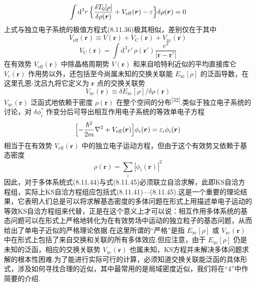 \begin{equation}
  \int\mathrm{d}^{3}r\,\Bigl\{\frac{\delta T_{0}[\rho]}{\delta\rho(\boldsymbol{r})}+V_{\mathrm{eff}}(\boldsymbol{r})-\varepsilon\Bigr\}\delta\rho(\boldsymbol{r})=0
\end{equation}
上式与独立电子系统的极值方程式(8.11.36)极其相似，差别仅在于其中
\begin{equation}
  V_{\mathrm{eff}}(\boldsymbol{r})\equiv V(\boldsymbol{r})+V_{\mathrm{C}}(\boldsymbol{r})+V_{\mathrm{xc}}(\boldsymbol{r})
\end{equation}
\begin{equation}
  V_{\mathrm{C}}(\boldsymbol{r})=\int\mathrm{d}^{3}r'\,\rho(\boldsymbol{r}')\frac{e^{2}}{|\boldsymbol{r}-\boldsymbol{r}'|}
\end{equation}
在有效势 $V_{\mathrm{eff}}(\boldsymbol{r})$ 中除晶格周期势 $V(\boldsymbol{r})$ 和来自哈特利近似的平均直接库仑 $V_{\mathrm{c}}(\boldsymbol{r})$ 作用势以外，还包括至今尚属未知的交换关联能 $E_{\mathrm{xc}}[\rho]$ 的泛函导数，在这里孔恩-沈吕九将它定义为 $\boldsymbol{r}$ 点的交换关联势
\begin{equation}
  V_{\mathrm{xc}}(\boldsymbol{r})\equiv\delta E_{\mathrm{xc}}[\rho]/\delta\rho(\boldsymbol{r})
\end{equation}
$V_{\mathrm{xc}}(\boldsymbol{r})$ 泛函式地依赖于密度 $\rho(\boldsymbol{r})$ 在整个空间的分布\textsuperscript{[32]}.类似于独立电子系统的讨论，对 $\delta\phi_{i}^{*}$ 作变分后可导出相互作用电子系统的等效单电子方程
\begin{equation}
  \Bigl[-\frac{\hbar^{2}}{2m}\nabla^{2}+V_{\mathrm{eff}}(\boldsymbol{r})\Bigr]\phi_{i}(\boldsymbol{r})=\varepsilon_{i}\phi_{i}(\boldsymbol{r})
\end{equation}
相当于在有效势 $V_{\mathrm{eff}}(\boldsymbol{r})$ 中的独立电子运动方程，但由于这个有效势又依赖于基态密度
\begin{equation}
  \rho(\boldsymbol{r})=\sum_{i}|\phi_{i}(\boldsymbol{r})|^{2}
\end{equation}
因此，对于多体系统式(8.11.44)与式(8.11.45)必须联立自洽求解，此即KS自洽方程组，实际上KS自洽方程组应包括式(8.11.41)—(8.11.45).这是一个重要的理论结果，它表明人们总是可以将求解基态密度的多体问题在形式上用描述单电子运动的等效KS自洽方程组来代替，正是在这个意义上才可以说：相互作用多体系统的基态问题可以在形式上严格地转化为在有效势场中运动的独立粒子的基态问题，从而给出了单电子近似的严格理论依据.在这里所谓的“严格”是指 $E_{\mathrm{xc}}[\rho]$ 或 $V_{\mathrm{xc}}(\boldsymbol{r})$ 中在形式上包括了来自交换和关联的所有多体效应.但应注意，由于 $E_{\mathrm{xc}}[\rho]$ 仍是未知的泛函，相应的交换关联势 $V_{\mathrm{xc}}(\boldsymbol{r})$ 也属未知，KS方程并未解决多体问题求解的根本性困难.为了能进行实际可行的计算，必须知道交换关联能泛函的具体形式，涉及如何寻找合理的近似，其中最常用的是局域密度近似，我们将在“4”中作简要的介绍.

